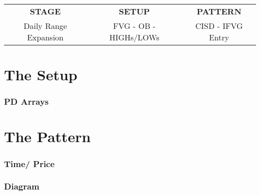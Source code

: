 \documentclass{article}
\begin{document}
\begin{table}[h!]
\centering
\renewcommand{\arraystretch}{2}
\setlength{\tabcolsep}{30pt}
\begin{tabular}{|c|c|c|}
  \hline
  \multirow{2}{*}{\textbf{STAGE}} & \multirow{2}{*}{\textbf{SETUP}} & \multirow{2}{*}{\textbf{PATTERN}} \\
   & & \\
  \hline
  Daily Range Expansion & \rule{0pt}{60pt}FVG - OB - HIGHs/LOWs\rule[-60pt]{0pt}{0pt} & CISD - IFVG Entry \- \\
  \hline
\end{tabular}
\end{table}








\section{The Setup}
\subsubsection{PD Arrays}

\section{The Pattern}
\subsubsection{Time/ Price}
\subsubsection{Diagram}
\end{document}
